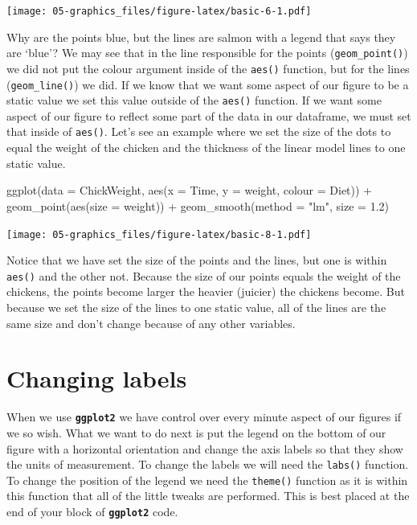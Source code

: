 \documentclass[
]{book}
\newenvironment{Shaded}{\begin{snugshade}}{\end{snugshade}}
\newcommand{\AttributeTok}[1]{\textcolor[rgb]{0.77,0.63,0.00}{#1}}
\newcommand{\FloatTok}[1]{\textcolor[rgb]{0.00,0.00,0.81}{#1}}
\newcommand{\FunctionTok}[1]{\textcolor[rgb]{0.00,0.00,0.00}{#1}}
\newcommand{\NormalTok}[1]{#1}
\newcommand{\SpecialCharTok}[1]{\textcolor[rgb]{0.00,0.00,0.00}{#1}}
\newcommand{\StringTok}[1]{\textcolor[rgb]{0.31,0.60,0.02}{#1}}
\begin{document}
\texttt{[image: 05-graphics\_files/figure-latex/basic-6-1.pdf]}

Why are the points blue, but the lines are salmon with a legend that says they are `blue'? We may see that in the line responsible for the points (\texttt{geom\_point()}) we did not put the colour argument inside of the \texttt{aes()} function, but for the lines (\texttt{geom\_line()}) we did. If we know that we want some aspect of our figure to be a static value we set this value outside of the \texttt{aes()} function. If we want some aspect of our figure to reflect some part of the data in our dataframe, we must set that inside of \texttt{aes()}. Let's see an example where we set the size of the dots to equal the weight of the chicken and the thickness of the linear model lines to one static value.

\begin{Shaded}
\begin{Highlighting}[]
\FunctionTok{ggplot}\NormalTok{(}\AttributeTok{data =}\NormalTok{ ChickWeight, }\FunctionTok{aes}\NormalTok{(}\AttributeTok{x =}\NormalTok{ Time, }\AttributeTok{y =}\NormalTok{ weight, }\AttributeTok{colour =}\NormalTok{ Diet)) }\SpecialCharTok{+}
  \FunctionTok{geom\_point}\NormalTok{(}\FunctionTok{aes}\NormalTok{(}\AttributeTok{size =}\NormalTok{ weight)) }\SpecialCharTok{+}
  \FunctionTok{geom\_smooth}\NormalTok{(}\AttributeTok{method =} \StringTok{"lm"}\NormalTok{, }\AttributeTok{size =} \FloatTok{1.2}\NormalTok{)}
\end{Highlighting}
\end{Shaded}

\texttt{[image: 05-graphics\_files/figure-latex/basic-8-1.pdf]}

Notice that we have set the size of the points and the lines, but one is within \texttt{aes()} and the other not. Because the size of our points equals the weight of the chickens, the points become larger the heavier (juicier) the chickens become. But because we set the size of the lines to one static value, all of the lines are the same size and don't change because of any other variables.

\hypertarget{changing-labels}{%
\section{Changing labels}\label{changing-labels}}

When we use \textbf{\texttt{ggplot2}} we have control over every minute aspect of our figures if we so wish. What we want to do next is put the legend on the bottom of our figure with a horizontal orientation and change the axis labels so that they show the units of measurement. To change the labels we will need the \texttt{labs()} function. To change the position of the legend we need the \texttt{theme()} function as it is within this function that all of the little tweaks are performed. This is best placed at the end of your block of \textbf{\texttt{ggplot2}} code.
\end{document}
